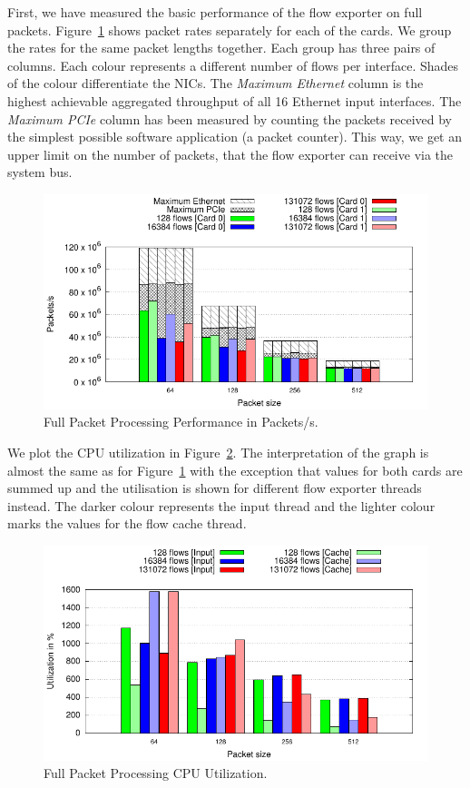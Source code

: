 First, we have measured the basic performance of the flow exporter on full packets. Figure~\ref{fig:pkt-full} shows packet rates separately for each of the cards. We group the rates for the same packet lengths together. Each group has three pairs of columns. Each colour represents a different number of flows per interface. Shades of the colour differentiate the NICs. The \emph{Maximum Ethernet} column is the highest achievable aggregated throughput of all 16 Ethernet input interfaces. The \emph{Maximum PCIe} column has been measured by counting the packets received by the simplest possible software application (a packet counter). This way, we get an upper limit on the number of packets, that the flow exporter can receive via the system bus.

\begin{figure}[!htb]
    \centering 
    \includegraphics{figures/paper-highdensity/graphs/packets-full-cards.pdf}
    \caption{Full Packet Processing Performance in Packets/s.}
    \label{fig:pkt-full}
\end{figure}


We plot the CPU utilization in Figure~\ref{fig:cpu-full}. The interpretation of the graph is almost the same as for Figure~\ref{fig:pkt-full} with the exception that values for both cards are summed up and the utilisation is shown for different flow exporter threads instead. The darker colour represents the input thread and the lighter colour marks the values for the flow cache thread.

\begin{figure}[!htb]
    \centering 
    \includegraphics{figures/paper-highdensity/graphs/cpu-full.pdf}
    \caption{Full Packet Processing CPU Utilization.}
    \label{fig:cpu-full}
\end{figure}

